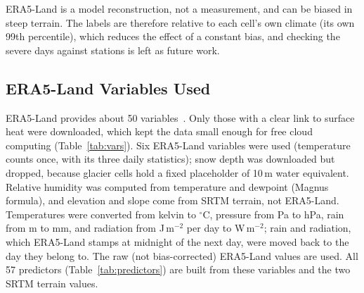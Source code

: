 \documentclass[12pt,a4paper]{report}
\begin{document}
\noindent ERA5-Land is a model reconstruction, not a measurement, and can be biased in steep terrain. The labels are
therefore relative to each cell's own climate (its own 99th percentile), which reduces the effect of a constant bias,
and checking the severe days against stations is left as future work.

\subsection{ERA5-Land Variables Used}
ERA5-Land provides about 50 variables~\cite{munoz2021era5land}. Only those with a clear link to surface heat were
downloaded, which kept the data small enough for free cloud computing (Table~\ref{tab:vars}). Six ERA5-Land variables were used
(temperature counts once, with its three daily statistics); snow depth was downloaded but dropped, because glacier cells hold a fixed placeholder of 10\,m water equivalent.
Relative humidity was computed from temperature and dewpoint (Magnus formula), and elevation and slope come from SRTM
terrain, not ERA5-Land. Temperatures were converted from
kelvin to $^\circ$C, pressure from Pa to hPa, rain from m to mm, and radiation from J\,m$^{-2}$ per day to
W\,m$^{-2}$; rain and radiation, which ERA5-Land stamps at midnight of the next day, were moved back to the day they
belong to. The raw (not bias-corrected) ERA5-Land values are used. All 57 predictors
(Table~\ref{tab:predictors}) are built from these variables and the two SRTM terrain values.
\end{document}
